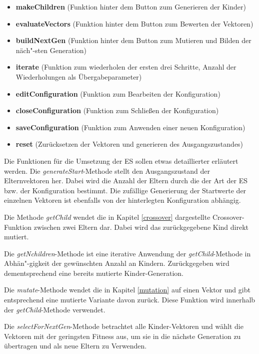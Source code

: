 \documentclass[]{scrartcl}
\begin{document}
\begin{itemize}
	\item \textbf{makeChildren} (Funktion hinter dem Button zum Generieren der Kinder)
	\item \textbf{evaluateVectors} (Funktion hinter dem Button zum Bewerten der  Vektoren)
	\item \textbf{buildNextGen} (Funktion hinter dem Button zum Mutieren und Bilden der näch"-sten Generation)
	\item \textbf{iterate} (Funktion zum wiederholen der ersten drei Schritte, Anzahl der Wiederholungen als Übergabeparameter)
	\item \textbf{editConfiguration} (Funktion zum Bearbeiten der Konfiguration)
	\item \textbf{closeConfiguration} (Funktion zum Schließen der Konfiguration)
	\item \textbf{saveConfiguration} (Funktion zum Anwenden einer neuen Konfiguration)
	\item \textbf{reset} (Zurücksetzen der Vektoren und generieren des Ausgangszustandes)
\end{itemize}


Die Funktionen für die Umsetzung der ES sollen etwas detaillierter erläutert werden. Die \textit{generateStart}-Methode stellt den Ausgangszustand der Elternvektoren her. Dabei wird die Anzahl der Eltern durch die der Art der ES bzw. der Konfiguration bestimmt. Die zufällige Generierung der Startwerte der einzelnen Vektoren ist ebenfalls von der hinterlegten Konfiguration abhängig.

Die Methode \textit{getChild} wendet die in Kapitel \ref{crossover} dargestellte Crossover-Funktion zwischen zwei Eltern dar. Dabei wird das zurückgegebene Kind direkt mutiert.

Die \textit{getNchildren}-Methode ist eine iterative Anwendung der \textit{getChild}-Methode in Abhän"-gigkeit der gewünschten Anzahl an Kindern. Zurückgegeben wird dementsprechend eine bereits mutierte Kinder-Generation.

Die \textit{mutate}-Methode wendet die in Kapitel \ref{mutation} auf einen Vektor und gibt entsprechend eine mutierte Variante davon zurück. Diese Funktion wird innerhalb der \textit{getChild}-Methode verwendet.

Die \textit{selectForNextGen}-Methode betrachtet alle Kinder-Vektoren und wählt die Vektoren mit der geringsten Fitness aus, um sie in die nächste Generation zu übertragen und als neue Eltern zu Verwenden.
\end{document}
